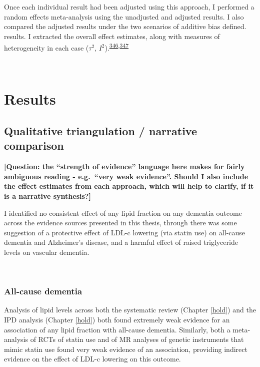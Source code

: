 \documentclass[a4paper, twoside]{templates/ociamthesis}
\begin{document}
Once each individual result had been adjusted using this approach, I performed a random effects meta-analysis using the unadjusted and adjusted results. I also compared the adjusted results under the two scenarios of additive bias defined. results. I extracted the overall effect estimates, along with measures of heterogeneity in each case (\(\tau^2\), \(I^2\)).\textsuperscript{\protect\hyperlink{ref-higgins2003}{346},\protect\hyperlink{ref-higgins2008}{347}}

~

\hypertarget{results-3}{%
\section{Results}\label{results-3}}

\hypertarget{qualitative-triangulation-narrative-comparison}{%
\subsection{Qualitative triangulation / narrative comparison}\label{qualitative-triangulation-narrative-comparison}}

\textbf{{[}Question: the ``strength of evidence'' language here makes for fairly ambiguous reading - e.g.~``very weak evidence''. Should I also include the effect estimates from each approach, which will help to clarify, if it is a narrative synthesis?{]}}

I identified no consistent effect of any lipid fraction on any dementia outcome across the evidence sources presented in this thesis, through there was some suggestion of a protective effect of LDL-c lowering (via statin use) on all-cause dementia and Alzheimer's disease, and a harmful effect of raised triglyceride levels on vascular dementia.

~

\hypertarget{all-cause-dementia}{%
\subsubsection{All-cause dementia}\label{all-cause-dementia}}

Analysis of lipid levels across both the systematic review (Chapter \ref{hold}) and the IPD analysis (Chapter \ref{hold}) both found extremely weak evidence for an association of any lipid fraction with all-cause dementia. Similarly, both a meta-analysis of RCTs of statin use and of MR analyses of genetic instruments that mimic statin use found very weak evidence of an association, providing indirect evidence on the effect of LDL-c lowering on this outcome.
\end{document}
